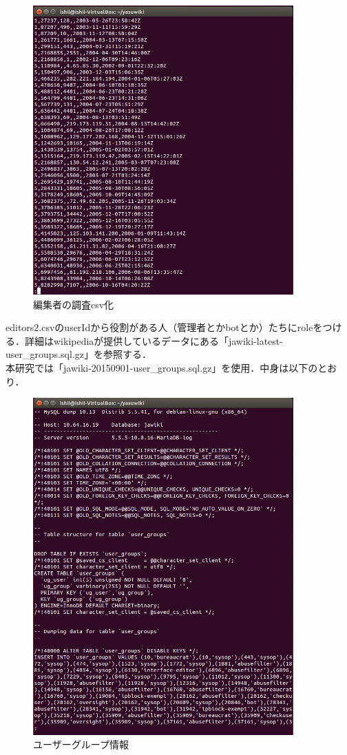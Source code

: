 \begin{figure}[H]
\centering
\includegraphics[width=10cm]{editors2_csv.png}
\caption{編集者の調査csv化}\label{サンプル図}
\end{figure}


editors2.csvのuserIdから役割がある人（管理者とかbotとか）たちにroleをつける．詳細はwikipediaが提供しているデータにある「jawiki-latest-user\_groups.sql.gz」を参照する． \\
本研究では「jawiki-20150901-user\_groups.sql.gz」を使用．中身は以下のとおり． 

\begin{figure}[H]
\centering
\includegraphics[width=10cm]{user_group1.png}
\caption{ユーザーグループ情報}\label{サンプル図}
\end{figure}


